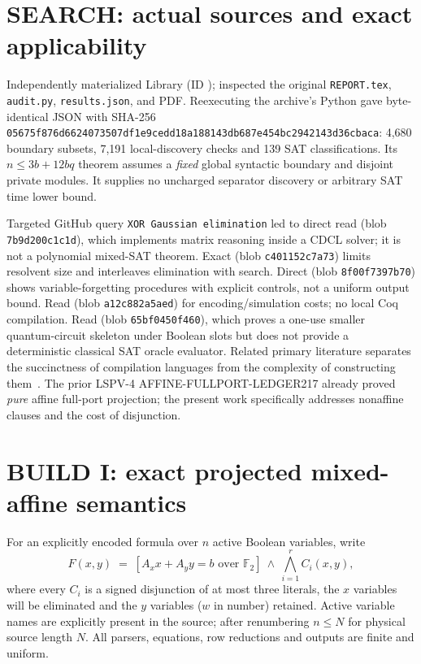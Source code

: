 \documentclass[11pt]{article}
\begin{document}
\section{SEARCH: actual sources and exact applicability}
Independently materialized Library  (ID ); inspected the original \texttt{REPORT.tex}, \texttt{audit.py}, \texttt{results.json}, and PDF. Reexecuting the archive's Python gave byte-identical JSON with SHA-256 \texttt{05675f876d6624073507df1e9cedd18a188143db687e454bc2942143d36cbaca}: 4,680 boundary subsets, 7,191 local-discovery checks and 139 SAT classifications. Its $n\le 3b+12bq$ theorem assumes a \emph{fixed} global syntactic boundary and disjoint private modules. It supplies no uncharged separator discovery or arbitrary SAT time lower bound.

Targeted GitHub query \texttt{XOR Gaussian elimination} led to direct read  (blob \texttt{7b9d200c1c1d}), which implements matrix reasoning inside a CDCL solver; it is not a polynomial mixed-SAT theorem. Exact  (blob \texttt{c401152c7a73}) limits resolvent size and interleaves elimination with search. Direct  (blob \texttt{8f00f7397b70}) shows variable-forgetting procedures with explicit controls, not a uniform output bound. Read  (blob \texttt{a12c882a5aed}) for encoding/simulation costs; no local Coq compilation. Read  (blob \texttt{65bf0450f460}), which proves a one-use smaller quantum-circuit skeleton under Boolean slots but does not provide a deterministic classical SAT oracle evaluator. Related primary literature separates the succinctness of compilation languages from the complexity of constructing them~\cite{darwiche,laitinen,han}. The prior LSPV-4 AFFINE-FULLPORT-LEDGER217 already proved \emph{pure} affine full-port projection; the present work specifically addresses nonaffine clauses and the cost of disjunction.

\section{BUILD I: exact projected mixed-affine semantics}
For an explicitly encoded formula over $n$ active Boolean variables, write
\[
 F(x,y)\;=\;[A_xx+A_yy=b\text{ over }\mathbb F_2]\ \wedge\ \bigwedge_{i=1}^{r}C_i(x,y),
\]
where every $C_i$ is a signed disjunction of at most three literals, the $x$ variables will be eliminated and the $y$ variables ($w$ in number) retained. Active variable names are explicitly present in the source; after renumbering $n\le N$ for physical source length $N$. All parsers, equations, row reductions and outputs are finite and uniform.
\end{document}
